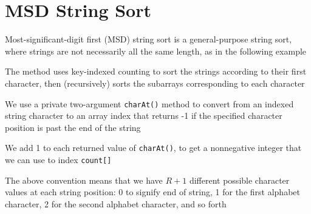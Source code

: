 \documentclass[8pt,a4paper,compress]{beamer}
\begin{document}
\section{MSD String Sort}
\begin{frame}[fragile]
\pause

Most-significant-digit first (MSD) string sort is a general-purpose string sort, where strings are not necessarily all the same length, as in the following example

\begin{center}
\end{center}

\pause
\bigskip

The method uses key-indexed counting to sort the strings according to
their first character, then (recursively) sorts the subarrays corresponding to each character
\end{frame}

\begin{frame}[fragile]
\pause

We use a private two-argument \lstinline{charAt()} method to convert from an indexed string character to an array index that returns -1 if the specified character position is past the end of the string

\pause
\bigskip

We add 1 to each returned value of \lstinline{charAt()}, to get a nonnegative integer that we can use to index \lstinline{count[]}

\pause
\bigskip

The above convention means that we have $R+1$ different possible character values at each string position: 0 to signify end of string,
1 for the first alphabet character, 2 for the second alphabet
character, and so forth
\end{frame}
\end{document}

